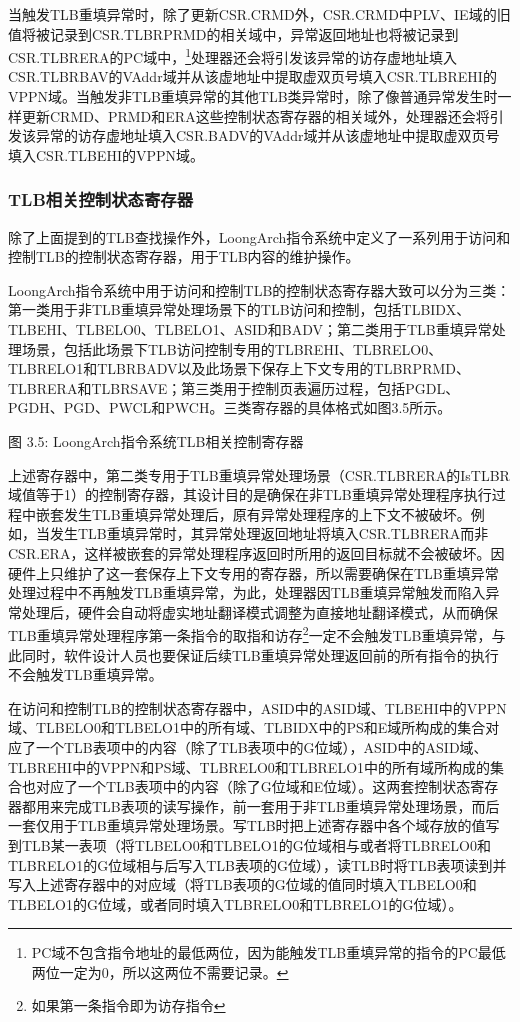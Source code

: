 \documentclass[]{ctexbook}
\begin{document}
当触发TLB重填异常时，除了更新CSR.CRMD外，CSR.CRMD中PLV、IE域的旧值将被记录到CSR.TLBRPRMD的相关域中，异常返回地址也将被记录到CSR.TLBRERA的PC域中，\footnote{PC域不包含指令地址的最低两位，因为能触发TLB重填异常的指令的PC最低两位一定为0，所以这两位不需要记录。}处理器还会将引发该异常的访存虚地址填入CSR.TLBRBAV的VAddr域并从该虚地址中提取虚双页号填入CSR.TLBREHI的VPPN域。当触发非TLB重填异常的其他TLB类异常时，除了像普通异常发生时一样更新CRMD、PRMD和ERA这些控制状态寄存器的相关域外，处理器还会将引发该异常的访存虚地址填入CSR.BADV的VAddr域并从该虚地址中提取虚双页号填入CSR.TLBEHI的VPPN域。

\hypertarget{tlbux76f8ux5173ux63a7ux5236ux72b6ux6001ux5bc4ux5b58ux5668}{%
\subsubsection{TLB相关控制状态寄存器}\label{tlbux76f8ux5173ux63a7ux5236ux72b6ux6001ux5bc4ux5b58ux5668}}

除了上面提到的TLB查找操作外，LoongArch指令系统中定义了一系列用于访问和控制TLB的控制状态寄存器，用于TLB内容的维护操作。

LoongArch指令系统中用于访问和控制TLB的控制状态寄存器大致可以分为三类：第一类用于非TLB重填异常处理场景下的TLB访问和控制，包括TLBIDX、TLBEHI、TLBELO0、TLBELO1、ASID和BADV；第二类用于TLB重填异常处理场景，包括此场景下TLB访问控制专用的TLBREHI、TLBRELO0、TLBRELO1和TLBRBADV以及此场景下保存上下文专用的TLBRPRMD、TLBRERA和TLBRSAVE；第三类用于控制页表遍历过程，包括PGDL、PGDH、PGD、PWCL和PWCH。三类寄存器的具体格式如图3.5所示。

图 3.5: LoongArch指令系统TLB相关控制寄存器

上述寄存器中，第二类专用于TLB重填异常处理场景（CSR.TLBRERA的IsTLBR域值等于1）的控制寄存器，其设计目的是确保在非TLB重填异常处理程序执行过程中嵌套发生TLB重填异常处理后，原有异常处理程序的上下文不被破坏。例如，当发生TLB重填异常时，其异常处理返回地址将填入CSR.TLBRERA而非CSR.ERA，这样被嵌套的异常处理程序返回时所用的返回目标就不会被破坏。因硬件上只维护了这一套保存上下文专用的寄存器，所以需要确保在TLB重填异常处理过程中不再触发TLB重填异常，为此，处理器因TLB重填异常触发而陷入异常处理后，硬件会自动将虚实地址翻译模式调整为直接地址翻译模式，从而确保TLB重填异常处理程序第一条指令的取指和访存\footnote{如果第一条指令即为访存指令}一定不会触发TLB重填异常，与此同时，软件设计人员也要保证后续TLB重填异常处理返回前的所有指令的执行不会触发TLB重填异常。

在访问和控制TLB的控制状态寄存器中，ASID中的ASID域、TLBEHI中的VPPN域、TLBELO0和TLBELO1中的所有域、TLBIDX中的PS和E域所构成的集合对应了一个TLB表项中的内容（除了TLB表项中的G位域），ASID中的ASID域、TLBREHI中的VPPN和PS域、TLBRELO0和TLBRELO1中的所有域所构成的集合也对应了一个TLB表项中的内容（除了G位域和E位域）。这两套控制状态寄存器都用来完成TLB表项的读写操作，前一套用于非TLB重填异常处理场景，而后一套仅用于TLB重填异常处理场景。写TLB时把上述寄存器中各个域存放的值写到TLB某一表项（将TLBELO0和TLBELO1的G位域相与或者将TLBRELO0和TLBRELO1的G位域相与后写入TLB表项的G位域），读TLB时将TLB表项读到并写入上述寄存器中的对应域（将TLB表项的G位域的值同时填入TLBELO0和TLBELO1的G位域，或者同时填入TLBRELO0和TLBRELO1的G位域）。
\end{document}
